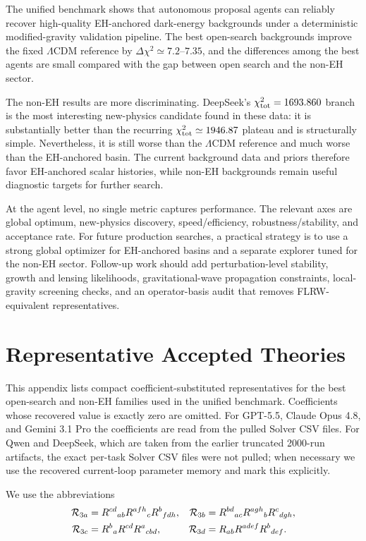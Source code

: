 \documentclass[aps,prd,twocolumn,superscriptaddress,nofootinbib,longbibliography]{revtex4-2}
\newcommand{\chiT}{\chi^2_{\rm tot}}
\begin{document}
The unified benchmark shows that autonomous proposal agents can reliably recover high-quality EH-anchored dark-energy backgrounds under a deterministic modified-gravity validation pipeline.  The best open-search backgrounds improve the fixed $\Lambda$CDM reference by $\Delta\chi^2\simeq7.2$--$7.35$, and the differences among the best agents are small compared with the gap between open search and the non-EH sector.

The non-EH results are more discriminating.  DeepSeek's $\chiT=1693.860$ branch is the most interesting new-physics candidate found in these data: it is substantially better than the recurring $\chiT\simeq1946.87$ plateau and is structurally simple.  Nevertheless, it is still worse than the $\Lambda$CDM reference and much worse than the EH-anchored basin.  The current background data and priors therefore favor EH-anchored scalar histories, while non-EH backgrounds remain useful diagnostic targets for further search.

At the agent level, no single metric captures performance.  The relevant axes are global optimum, new-physics discovery, speed/efficiency, robustness/stability, and acceptance rate.  For future production searches, a practical strategy is to use a strong global optimizer for EH-anchored basins and a separate explorer tuned for the non-EH sector.  Follow-up work should add perturbation-level stability, growth and lensing likelihoods, gravitational-wave propagation constraints, local-gravity screening checks, and an operator-basis audit that removes FLRW-equivalent representatives.

\appendix
\section{Representative Accepted Theories}
\label{app:representatives}

This appendix lists compact coefficient-substituted representatives for the best open-search and non-EH families used in the unified benchmark.  Coefficients whose recovered value is exactly zero are omitted.  For GPT-5.5, Claude Opus 4.8, and Gemini 3.1 Pro the coefficients are read from the pulled Solver CSV files.  For Qwen and DeepSeek, which are taken from the earlier truncated 2000-run artifacts, the exact per-task Solver CSV files were not pulled; when necessary we use the recovered current-loop parameter memory and mark this explicitly.

We use the abbreviations
\begin{align}
{\cal R}_{3a}&=R^{cd}{}_{ab}R^{afh}{}_cR^b{}_{fdh},&
{\cal R}_{3b}&=R^{bd}{}_{ac}R^{agh}{}_bR^c{}_{dgh},\\
{\cal R}_{3c}&=R^b{}_aR^{cd}R^a{}_{cbd},&
{\cal R}_{3d}&=R_{ab}R^{adef}R^b{}_{def} .
\end{align}
\end{document}
